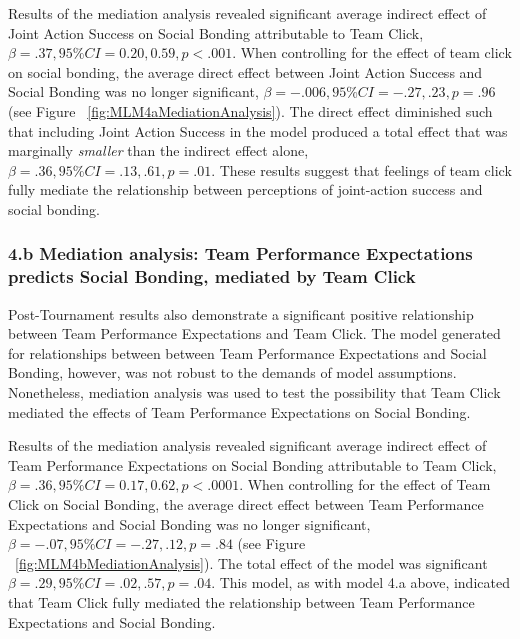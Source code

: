 Results of the mediation analysis revealed significant average indirect effect of Joint Action Success on Social Bonding attributable to Team Click, $\beta = .37, 95\% CI = 0.20 , 0.59, p < .001$.  When controlling for the effect of team click on social bonding, the average direct effect between Joint Action Success and Social Bonding was no longer significant, $\beta = -.006, 95\% CI = -.27 , .23, p = .96 $ (see Figure ~\ref{fig:MLM4aMediationAnalysis}). The direct effect diminished such that including Joint Action Success in the model produced a total effect that was marginally \textit{smaller} than the indirect effect alone, $\beta = .36, 95\% CI = .13 , .61, p = .01$. These results suggest that feelings of team click fully mediate the relationship between perceptions of joint-action success and social bonding.





\subsubsection{4.b Mediation analysis: Team Performance Expectations predicts Social Bonding, mediated by Team Click}

Post-Tournament results also demonstrate a significant positive relationship between Team Performance Expectations and Team Click. The model generated for relationships between between Team Performance Expectations and Social Bonding, however, was not robust to the demands of model assumptions.   Nonetheless, mediation analysis was used to test the possibility that Team Click mediated the effects of Team Performance Expectations on Social Bonding.

Results of the mediation analysis revealed significant average indirect effect of Team Performance Expectations on Social Bonding attributable to Team Click, $\beta = .36, 95\% CI = 0.17 , 0.62, p < .0001$.  When controlling for the effect of Team Click on Social Bonding, the average direct effect between Team Performance Expectations and Social Bonding was no longer significant, $\beta = -.07, 95\% CI = -.27 , .12, p = .84 $ (see Figure ~\ref{fig:MLM4bMediationAnalysis}). The total effect of the model was significant $\beta = .29, 95\% CI = .02 , .57, p = .04$.  This model, as with model 4.a above, indicated that Team Click fully mediated the relationship between Team Performance Expectations and Social Bonding.


